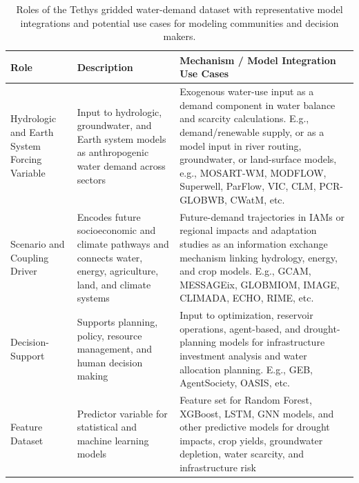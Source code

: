 \documentclass[fleqn,10pt]{wlscirep}
\begin{document}
\begin{table}[!ht]
\centering
\small
\begin{tabular}{p{3.2cm} p{4.5cm} p{8.4cm}}
\hline
\textbf{Role} & \textbf{Description} & \textbf{Mechanism / Model Integration Use Cases} \\
\hline

Hydrologic and Earth System Forcing Variable &
Input to hydrologic, groundwater, and Earth system models as anthropogenic water demand across sectors &
Exogenous water-use input as a demand component in water balance and scarcity calculations. E.g., demand/renewable supply, or as a model input in river routing, groundwater, or land-surface models, e.g., MOSART-WM, MODFLOW, Superwell, ParFlow, VIC, CLM, PCR-GLOBWB, CWatM, etc. \\


Scenario and Coupling Driver &
Encodes future socioeconomic and climate pathways and connects water, energy, agriculture, land, and climate systems &
Future-demand trajectories in IAMs or regional impacts and adaptation studies as an information exchange mechanism linking hydrology, energy, and crop models. E.g., GCAM, MESSAGEix, GLOBMIOM, IMAGE, CLIMADA, ECHO, RIME, etc. \\


Decision-Support &
Supports planning, policy, resource management, and human decision making &
Input to optimization, reservoir operations, agent-based, and drought-planning models for infrastructure investment analysis and water allocation planning. E.g., GEB, AgentSociety, OASIS, etc. \\

Feature Dataset &
Predictor variable for statistical and machine learning models &
Feature set for Random Forest, XGBoost, LSTM, GNN models, and other predictive models for drought impacts, crop yields, groundwater depletion, water scarcity, and infrastructure risk \\

\hline
\end{tabular}
\caption{Roles of the Tethys gridded water-demand dataset with representative model integrations and potential use cases for modeling communities and decision makers.}
\label{tab:water_demand_roles}
\end{table}
\end{document}
